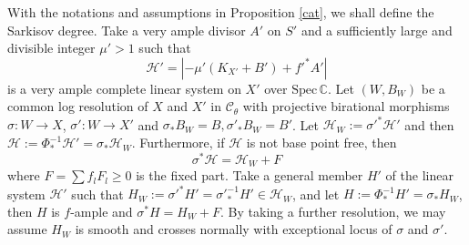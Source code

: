 \documentclass[11pt]{amsart}
\begin{document}
With the notations and assumptions in Proposition \ref{cat},   we shall define the Sarkisov degree. Take a  very ample divisor $ A'  $ on $ S' $ and a sufficiently large and divisible integer $ \mu'>1 $ such that 
\[ \mathcal{H}'=|-\mu' (K_{X'}+B') +f'^*A'| \]
is a very ample complete linear system on $ X' $ over $ \mathrm{Spec}\,\mathbb{C} $. Let $ (W,B_W) $ be a common log resolution of $ X $ and $ X' $ in $ \mathcal{C}_\theta $ with projective birational morphisms $ \sigma:W\to X$,   $\sigma':W\to X' $ and $\sigma_*B_W=B, \sigma'_*B_W=B' $. Let $\mathcal{H}_W:=\sigma'^*\mathcal{H}'$
and then  $\mathcal{H}:=\Phi^{-1}_*\mathcal{H}'=\sigma_*\mathcal{H}_W$. Furthermore, if $ \mathcal{H} $ is not base point free, then
\[ \sigma^*\mathcal{H}=\mathcal{H}_W+F \]
where $ F=\sum f_lF_l\geqslant0 $ is the fixed part. Take a general member $ H' $ of the linear system $ \mathcal{H}' $ such that $ H_W:=\sigma'^*H'=\sigma'^{-1}_*H'\in \mathcal{H}_W $, and let $ H:=\Phi^{-1}_*H'=\sigma_*H_{W} $, then $H$ is $f$-ample and $ \sigma^*H=H_W+F $. By taking  a further resolution, we may assume $H_{W}$ is smooth and crosses normally with exceptional locus of $\sigma$ and $\sigma'$.
\end{document}
